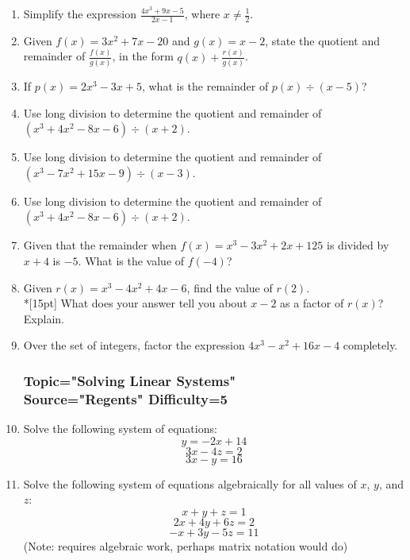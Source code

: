 \documentclass[12pt, oneside]{article}
\begin{document}
\begin{enumerate}
\item Simplify the expression $\displaystyle \frac{4x^3+9x-5}{2x-1}$, where $x \neq \frac{1}{2}$. %

\item Given $f(x)=3x^2+7x-20$ and $g(x)=x-2$, state the quotient and remainder of $\displaystyle \frac{f(x)}{g(x)}$, in the form $\displaystyle q(x)+ \frac{r(x)}{g(x)}$. %

\item If $p(x)=2x^3-3x+5$, what is the remainder of $p(x) \div (x-5)$? %

\item Use long division to determine the quotient and remainder of $(x^3+4x^2-8x-6) \div (x+2)$.
\item Use long division to determine the quotient and remainder of $(x^3-7x^2+15x-9) \div (x-3)$.
\item Use long division to determine the quotient and remainder of $(x^3+4x^2-8x-6) \div (x+2)$.

\item Given that the remainder when  $f(x)=x^3-3x^2+2x+125$ is divided by $x+4$ is $-5$. What is the value of $f(-4)$?

\item Given $r(x)=x^3-4x^2+4x-6$, find the value of $r(2)$.\\*[15pt]
What does your answer tell you about $x-2$ as a factor of $r(x)$? Explain. %

\item Over the set of integers, factor the expression $4x^3-x^2  +16x-4$ completely.
 
\subsubsection*{Topic="Solving Linear Systems"\\
Source="Regents" 
Difficulty=5}

\item Solve the following system of equations:
\[y=-2x+14\]
\[3x - 4z = 2\]
\[3x - y  = 16\]

\item Solve the following system of equations algebraically for all values of $x$, $y$, and $z$:
\[x +y+ z=1\]
\[2x+4y+6z=2\]
\[-x+3y-5z=11\]
(Note: requires algebraic work, perhaps matrix notation would do)


\end{enumerate}
\end{document}
